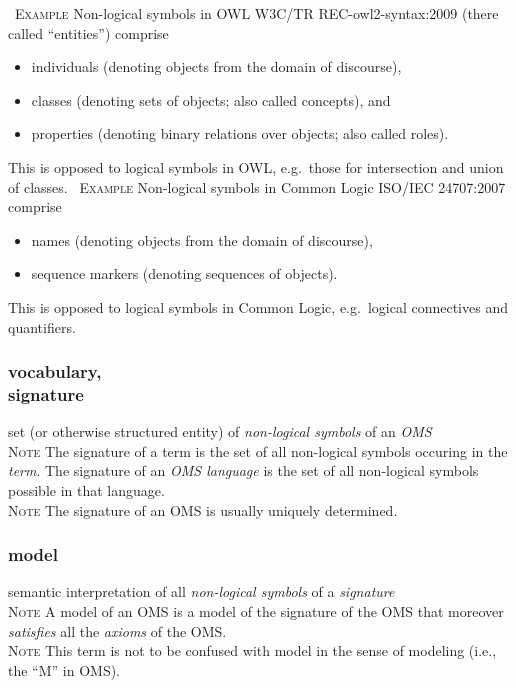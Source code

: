 \documentclass[10pt,%
\ifpretendfinal
final%
\else
draft%
\fi,
]{scrreprt}
\newcommand*{\termref}[1]{\textit{#1}}
\newcommand*{\synonym}{,\\}
\newcommand{\termdefinition}[2]{\subsubsection*{\normalsize #1}#2}
\newcommand{\nisref}[1]{#1}
\newenvironment{definitions}[0]{\medskip }{}
\newenvironment{note}[0]{\ \\ \textsc{Note} \quad}{}
\newenvironment{example}[0]{\ \newline \textsc{Example}\quad }{}
\begin{document}
\begin{definitions}
  \begin{example}
    Non-logical symbols in OWL \nisref{W3C/TR REC-owl2-syntax:2009} (there called ``entities'') comprise
    \begin{itemize}
    \item individuals (denoting objects from the domain of discourse),
    \item classes (denoting sets of objects; also called concepts), and
    \item properties (denoting binary relations over objects; also called
      roles).
    \end{itemize}
    This is opposed to logical symbols in OWL, e.g.\ those for intersection
    and union of classes.
  \end{example}
  \begin{example}
    Non-logical symbols in Common Logic \nisref{ISO/IEC 24707:2007} comprise
    \begin{itemize}
    \item names (denoting objects from the domain of discourse),
    \item sequence markers (denoting sequences of objects).
    \end{itemize}
    This is opposed to logical symbols in Common Logic, e.g.\ logical connectives and
    quantifiers.
  \end{example}


\termdefinition{vocabulary\synonym signature}{set (or otherwise
  structured entity) of \termref{non-logical symbols} of an
  \termref{OMS}}
   \begin{note}
     The signature of a term is the set of all non-logical symbols occuring
     in the \termref{term}. The signature of an \termref{OMS language} is the
     set of all non-logical symbols possible in that language.     
   \end{note}
   \begin{note}
    The signature of an OMS is usually uniquely determined.
   \end{note}
  \termdefinition{model}{semantic interpretation of all \termref{non-logical symbols} of a \termref{signature}}
  \begin{note}
    A model of an OMS is a model of the signature of the OMS
    that moreover \termref{satisfies} all the \termref{axioms} of the OMS.
  \end{note}
  \begin{note}
  This term is not to be confused with model in the sense of modeling (i.e.,
  the ``M'' in OMS).
  \end{note}


\end{definitions}
\end{document}
